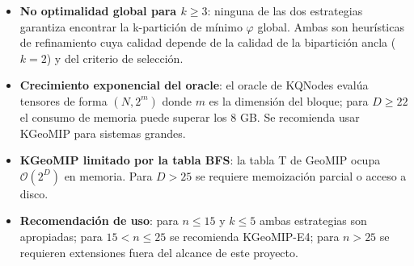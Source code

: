 \begin{itemize}
  \item \textbf{No optimalidad global para $k \geq 3$}: ninguna de las dos estrategias
        garantiza encontrar la k-partición de mínimo $\varphi$ global. Ambas son heurísticas
        de refinamiento cuya calidad depende de la calidad de la bipartición ancla ($k=2$) y
        del criterio de selección.

  \item \textbf{Crecimiento exponencial del oracle}: el oracle de KQNodes evalúa tensores
        de forma $(N, 2^m)$ donde $m$ es la dimensión del bloque; para $D \geq 22$ el consumo
        de memoria puede superar los 8 GB. Se recomienda usar KGeoMIP para sistemas grandes.

  \item \textbf{KGeoMIP limitado por la tabla BFS}: la tabla T de GeoMIP ocupa $\mathcal{O}(2^D)$
        en memoria. Para $D > 25$ se requiere memoización parcial o acceso a disco.

  \item \textbf{Recomendación de uso}: para $n \leq 15$ y $k \leq 5$ ambas estrategias son
        apropiadas; para $15 < n \leq 25$ se recomienda KGeoMIP-E4; para $n > 25$ se requieren
        extensiones fuera del alcance de este proyecto.
\end{itemize}
